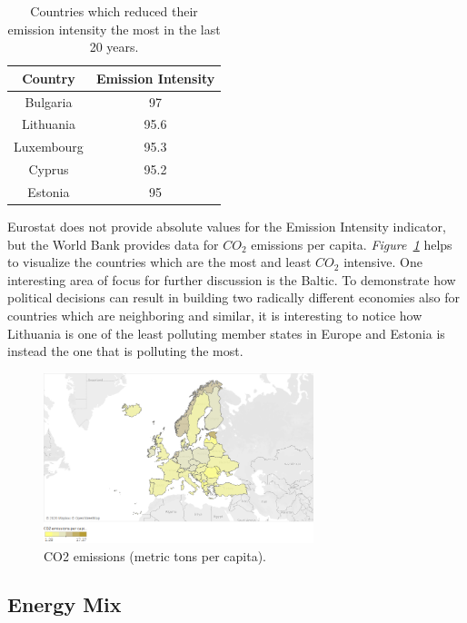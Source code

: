 \documentclass[a4paper,12pt]{book}
\begin{document}
\begin{table}[tb]
\begin{center}
\begin{tabular}{|c|c|}
\hline
Country & Emission Intensity \\
\hline
Bulgaria & 97\\
Lithuania & 95.6\\
Luxembourg & 95.3\\
Cyprus & 95.2\\
Estonia & 95\\
\hline
\end{tabular}
\caption{Countries which reduced their emission intensity the most in the last 20 years.}
\label{Tab:emiss}
\end{center}
\end{table}

Eurostat does not provide absolute values for the Emission Intensity indicator, but the World Bank provides data for $CO_{2}$ emissions per capita. \textit{Figure~\ref{fig:intensiti}} helps to visualize the countries which are the most and least $CO_{2}$ intensive. One interesting area of focus for further discussion is the Baltic. To demonstrate how political decisions can result in building two radically different economies also for countries which are neighboring and similar, it is interesting to notice how Lithuania is one of the least polluting member states in Europe and Estonia is instead the one that is polluting the most.

\begin{figure}[tb]
\begin{center}
\captionsetup{justification=centering}
\includegraphics[width=0.7\textwidth]{Images/intensiti.png}
\caption{CO2 emissions (metric tons per capita).}
\label{fig:intensiti}
\end{center}
\end{figure}

\subsection*{Energy Mix}
\end{document}
